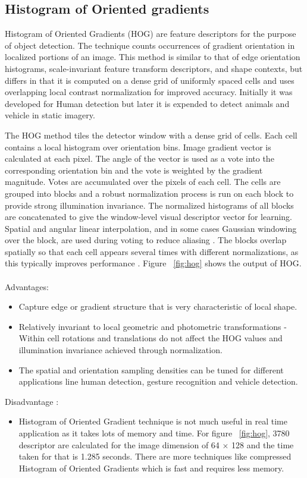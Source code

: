 \documentclass[11pt]{article}
\begin{document}
\subsection{Histogram of Oriented gradients}
Histogram of Oriented Gradients (HOG) are feature descriptors for the purpose of object detection. The technique counts occurrences of gradient orientation in localized portions of an image. This method is similar to that of edge orientation histograms, scale-invariant feature transform descriptors, and shape contexts, but differs in that it is computed on a dense grid of uniformly spaced cells and uses overlapping local contrast normalization for improved accuracy. Initially it was developed for Human detection but later it is expended to detect animals and vehicle in static imagery.

The HOG method tiles the detector window with a dense grid of cells. Each cell contains a local histogram over orientation bins. Image gradient vector is calculated at each pixel. The angle of the vector is used as a vote into the corresponding orientation bin and the vote is weighted by the gradient magnitude. Votes are accumulated over the pixels of each cell. The cells are grouped into blocks and a robust normalization process is run on each block to provide strong illumination invariance. The normalized histograms of all blocks are concatenated to give the window-level visual descriptor vector for learning. Spatial and angular linear interpolation, and in some cases Gaussian windowing over the block, are used during voting to reduce aliasing . The blocks overlap spatially so that each cell appears several times with different normalizations, as this typically improves performance \cite{Dalal:2005:HOG:1068507.1069007} .
Figure ~\ref{fig:hog} shows the output of HOG.
\\
\\Advantages:
\begin{itemize}[itemsep=0em]
\item
Capture edge or gradient structure that is very characteristic of local shape.
\item
Relatively invariant to local geometric and photometric
transformations - Within cell rotations and translations do not affect the HOG values and illumination invariance achieved through normalization.
\item 
The spatial and orientation sampling densities can be
tuned for different applications line human detection, gesture recognition and vehicle detection.
\end{itemize}
Disadvantage :
\begin{itemize}
\item
Histogram of Oriented Gradient technique is not much useful in real time application as it takes lots of memory and time. For figure ~\ref{fig:hog}, 3780 descriptor are calculated for the image dimension of 64 $\times$ 128 and the time taken for that is 1.285 seconds. There are more techniques like compressed Histogram of Oriented Gradients which is fast and requires less memory.
\end{itemize}






\end{document}
